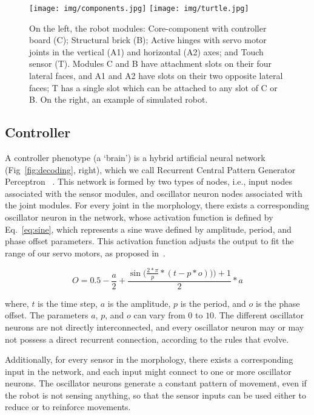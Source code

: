 \documentclass[utf8]{frontiersSCNS} %
\begin{document}
\begin{figure}[t]
\begin{center}
\texttt{[image: img/components.jpg]}
\texttt{[image: img/turtle.jpg]} 
\caption{On the left, the robot modules: Core-component with controller board (C); Structural brick (B); Active hinges with servo motor joints in the vertical (A1) and horizontal (A2) axes; and Touch sensor (T).  Modules C and B have attachment slots on their four lateral faces, and A1 and A2 have slots on their two opposite lateral faces; T has a single slot which can be attached to any slot of C or B.  
On the right, an example of simulated robot.}
\label{fig:components}
\end{center}
\end{figure}
\vspace{0.1cm}
\subsection{Controller}
 \label{sec:controllers}
A controller phenotype (a `brain') is a hybrid artificial neural network (Fig~\ref{fig:decoding}, right), which we call Recurrent Central Pattern Generator Perceptron ~\citep{miras2019effects}. This network is formed by two types of nodes, i.e., input nodes associated with the sensor modules, and oscillator neuron nodes associated with the joint modules. For every joint in the morphology, there exists a corresponding oscillator neuron in the network, whose activation function is defined by Eq.~\eqref{eq:sine}, which represents a sine wave defined by amplitude, period, and phase offset parameters. This activation function adjusts the output to fit the range of our servo motors, as proposed in~\citep{hupkes2018revolve}.

\begin{equation}
\label{eq:sine}
      O = 0.5 - \frac{a}{2} +  \frac{\sin\Bigg(\frac{2 * \pi}{p} * (t - p * o))\Bigg) + 1}{2}  * a 
\end{equation}

\noindent where, $t$ is the time step, $a$ is the amplitude, $p$ is the period, and $o$ is the phase offset. The parameters $a$, $p$, and $o$ can vary from $0$ to $10$.
The different oscillator neurons are not directly interconnected, and every oscillator neuron may or may not possess a direct recurrent connection, according to the rules that evolve. 

Additionally, for every sensor in the morphology, there exists a corresponding input in the network, and each input might connect to one or more oscillator neurons. The oscillator neurons generate a constant pattern of movement, even if the robot is not sensing anything, so that the sensor inputs can be used either to reduce or to reinforce movements. 
\end{document}
